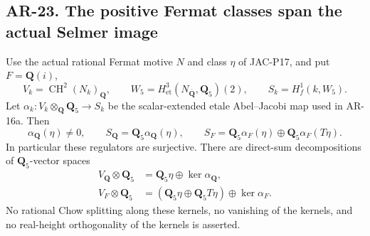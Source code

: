 \subsection*{AR-23. The positive Fermat classes span the actual Selmer image}

\begin{proposition}[AR-23]
Use the actual rational Fermat motive $N$ and class $\eta$ of JAC-P17,
and put $F=\mathbf Q(i)$,
\[
 V_k=\operatorname{CH}^2(N_k)_{\mathbf Q},\qquad
 W_5=H^3_{\mathrm{et}}(N_{\overline{\mathbf Q}},\mathbf Q_5)(2),
 \qquad S_k=H^1_f(k,W_5).
\]
Let
$\alpha_k:V_k\otimes_{\mathbf Q}\mathbf Q_5\to S_k$
be the scalar-extended etale Abel--Jacobi map used in AR-16a.
Then
\[
 \alpha_{\mathbf Q}(\eta)\ne0,\qquad
 S_{\mathbf Q}=\mathbf Q_5\alpha_{\mathbf Q}(\eta),
 \qquad
 S_F=\mathbf Q_5\alpha_F(\eta)
       \oplus\mathbf Q_5\alpha_F(T\eta).              \tag{AR.23a}
\]
In particular these regulators are surjective.  There are direct-sum
decompositions of $\mathbf Q_5$-vector spaces
\[
 \begin{split}
 V_{\mathbf Q}\otimes\mathbf Q_5
   &=\mathbf Q_5\eta\oplus\ker\alpha_{\mathbf Q},\\
 V_F\otimes\mathbf Q_5
   &=(\mathbf Q_5\eta\oplus\mathbf Q_5 T\eta)
                                      \oplus\ker\alpha_F.
 \end{split}                                                   \tag{AR.23b}
\]
No rational Chow splitting along these kernels, no vanishing of the
kernels, and no real-height orthogonality of the kernels is asserted.
\end{proposition}

